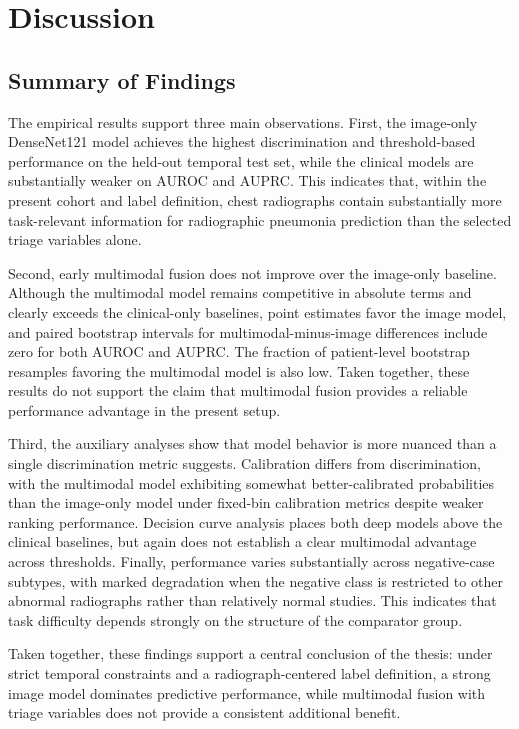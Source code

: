 \chapter{Discussion}

\section{Summary of Findings}

The empirical results support three main observations. First, the image-only DenseNet121 model achieves the highest discrimination and threshold-based performance on the held-out temporal test set, while the clinical models are substantially weaker on AUROC and AUPRC. This indicates that, within the present cohort and label definition, chest radiographs contain substantially more task-relevant information for radiographic pneumonia prediction than the selected triage variables alone.

Second, early multimodal fusion does not improve over the image-only baseline. Although the multimodal model remains competitive in absolute terms and clearly exceeds the clinical-only baselines, point estimates favor the image model, and paired bootstrap intervals for multimodal-minus-image differences include zero for both AUROC and AUPRC. The fraction of patient-level bootstrap resamples favoring the multimodal model is also low. Taken together, these results do not support the claim that multimodal fusion provides a reliable performance advantage in the present setup.

Third, the auxiliary analyses show that model behavior is more nuanced than a single discrimination metric suggests. Calibration differs from discrimination, with the multimodal model exhibiting somewhat better-calibrated probabilities than the image-only model under fixed-bin calibration metrics despite weaker ranking performance. Decision curve analysis places both deep models above the clinical baselines, but again does not establish a clear multimodal advantage across thresholds. Finally, performance varies substantially across negative-case subtypes, with marked degradation when the negative class is restricted to other abnormal radiographs rather than relatively normal studies. This indicates that task difficulty depends strongly on the structure of the comparator group.

Taken together, these findings support a central conclusion of the thesis: under strict temporal constraints and a radiograph-centered label definition, a strong image model dominates predictive performance, while multimodal fusion with triage variables does not provide a consistent additional benefit.

